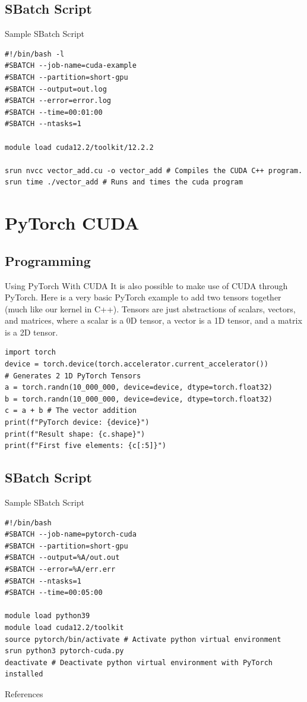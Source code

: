 \documentclass[aspectratio=169]{beamer}
\begin{document}
\subsection{SBatch Script}
\begin{frame}[fragile]{Sample SBatch Script}
	\begin{verbatim}
#!/bin/bash -l
#SBATCH --job-name=cuda-example
#SBATCH --partition=short-gpu
#SBATCH --output=out.log
#SBATCH --error=error.log
#SBATCH --time=00:01:00
#SBATCH --ntasks=1

module load cuda12.2/toolkit/12.2.2

srun nvcc vector_add.cu -o vector_add # Compiles the CUDA C++ program.
srun time ./vector_add # Runs and times the cuda program
	\end{verbatim}
\end{frame}

\section{PyTorch CUDA}
\subsection{Programming}
\begin{frame}[fragile]{Using PyTorch With CUDA}
	It is also possible to make use of CUDA through PyTorch. Here is a very basic PyTorch example to add two tensors together (much like our kernel in C++). Tensors are just abstractions of scalars, vectors, and matrices, where a scalar is a 0D tensor, a vector is a 1D tensor, and a matrix is a 2D tensor.

	\begin{verbatim}
import torch
device = torch.device(torch.accelerator.current_accelerator())
# Generates 2 1D PyTorch Tensors
a = torch.randn(10_000_000, device=device, dtype=torch.float32)
b = torch.randn(10_000_000, device=device, dtype=torch.float32)
c = a + b # The vector addition
print(f"PyTorch device: {device}")
print(f"Result shape: {c.shape}")
print(f"First five elements: {c[:5]}")
	\end{verbatim}
\end{frame}

\subsection{SBatch Script}

\begin{frame}[fragile]{Sample SBatch Script}
	\begin{verbatim}
#!/bin/bash
#SBATCH --job-name=pytorch-cuda
#SBATCH --partition=short-gpu
#SBATCH --output=%A/out.out
#SBATCH --error=%A/err.err
#SBATCH --ntasks=1
#SBATCH --time=00:05:00

module load python39
module load cuda12.2/toolkit
source pytorch/bin/activate # Activate python virtual environment 
srun python3 pytorch-cuda.py
deactivate # Deactivate python virtual environment with PyTorch installed
	\end{verbatim}
\end{frame}

\begin{frame}{References}
  \nocite{*}
 	\printbibliography[heading=bibintoc]
\end{frame}
\end{document}
